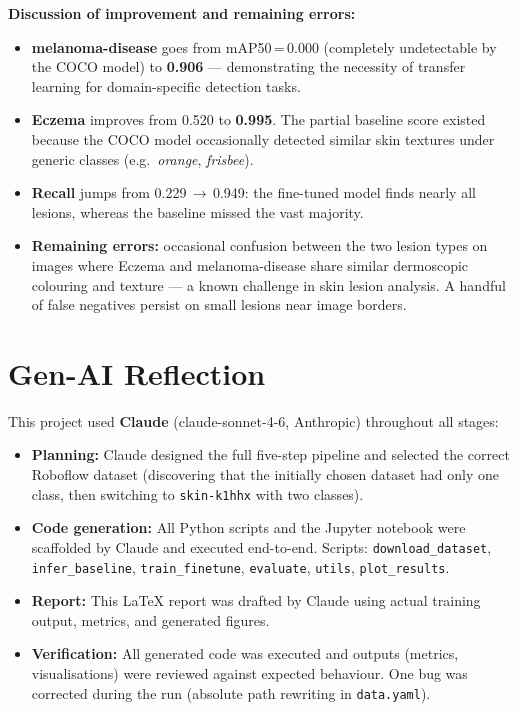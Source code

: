 \documentclass[11pt,a4paper]{article}
\begin{document}
\textbf{Discussion of improvement and remaining errors:}
\begin{itemize}[leftmargin=1.4em, itemsep=3pt]
  \item \textbf{melanoma-disease} goes from mAP50\,=\,0.000 (completely undetectable by the
        COCO model) to \textbf{0.906} --- demonstrating the necessity of transfer learning for
        domain-specific detection tasks.
  \item \textbf{Eczema} improves from 0.520 to \textbf{0.995}. The partial baseline score
        existed because the COCO model occasionally detected similar skin textures under generic
        classes (e.g.\ \emph{orange}, \emph{frisbee}).
  \item \textbf{Recall} jumps from 0.229\,$\to$\,0.949: the fine-tuned model finds nearly all
        lesions, whereas the baseline missed the vast majority.
  \item \textbf{Remaining errors:} occasional confusion between the two lesion types on images
        where Eczema and melanoma-disease share similar dermoscopic colouring and texture --- a
        known challenge in skin lesion analysis. A handful of false negatives persist on small
        lesions near image borders.
\end{itemize}

\section{Gen-AI Reflection}

This project used \textbf{Claude} (claude-sonnet-4-6, Anthropic) throughout all stages:

\begin{itemize}[leftmargin=1.4em, itemsep=3pt]
  \item \textbf{Planning:} Claude designed the full five-step pipeline and selected the correct
        Roboflow dataset (discovering that the initially chosen dataset had only one class, then
        switching to \texttt{skin-k1hhx} with two classes).
  \item \textbf{Code generation:} All Python scripts and the Jupyter notebook were scaffolded
        by Claude and executed end-to-end. Scripts: \texttt{download\_dataset},
        \texttt{infer\_baseline}, \texttt{train\_finetune}, \texttt{evaluate}, \texttt{utils},
        \texttt{plot\_results}.
  \item \textbf{Report:} This \LaTeX{} report was drafted by Claude using actual training
        output, metrics, and generated figures.
  \item \textbf{Verification:} All generated code was executed and outputs (metrics,
        visualisations) were reviewed against expected behaviour. One bug was corrected during
        the run (absolute path rewriting in \texttt{data.yaml}).
\end{itemize}
\end{document}
